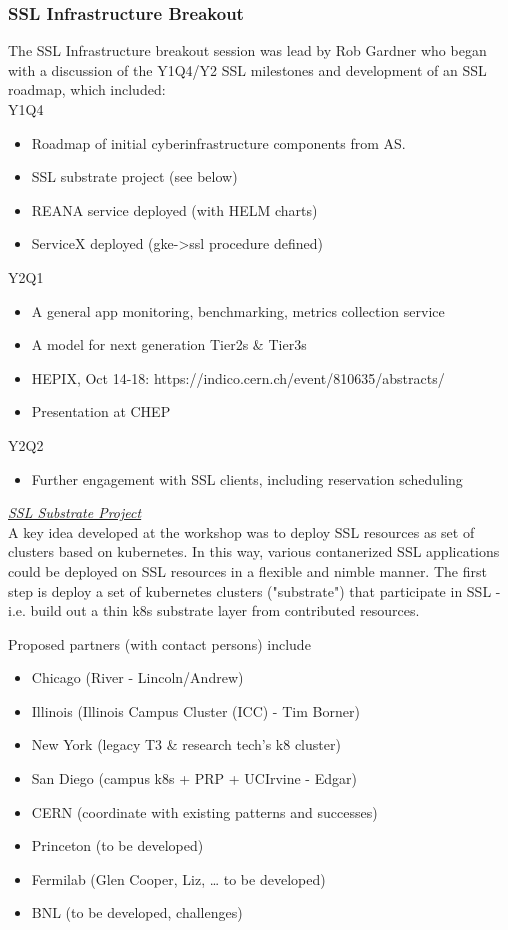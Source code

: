 \documentclass[11pt,letterpaper,fleqn]{article}
\begin{document}
\subsubsection{SSL Infrastructure Breakout}
The SSL Infrastructure breakout session was lead by Rob Gardner who began with a discussion of the Y1Q4/Y2 SSL milestones and development of an SSL roadmap, which included: \\
Y1Q4
\begin{itemize}
  \item Roadmap of initial cyberinfrastructure components from AS.
  \item SSL substrate project (see below)
  \item REANA service deployed (with HELM charts)
  \item ServiceX deployed (gke->ssl procedure defined)
\end{itemize}
Y2Q1
\begin{itemize}
  \item A general app monitoring, benchmarking, metrics collection service
  \item A model for next generation Tier2s \& Tier3s
  \item HEPIX, Oct 14-18: https://indico.cern.ch/event/810635/abstracts/
  \item Presentation at CHEP
\end{itemize}
Y2Q2
\begin{itemize}
  \item Further engagement with SSL clients, including reservation scheduling
\end{itemize}

\vspace{0.1cm}\noindent
\textit{\underline{SSL Substrate Project}} \\
A key idea developed at the workshop was to deploy SSL resources as set of clusters based on kubernetes. In this way, various contanerized SSL applications could be deployed on SSL resources in a flexible and nimble manner. The first step is deploy a set of kubernetes clusters ("substrate") that participate in SSL - i.e. build out a thin k8s substrate layer from contributed resources.

Proposed partners (with contact persons) include
\begin{itemize}
  \item Chicago (River - Lincoln/Andrew)
  \item Illinois (Illinois Campus Cluster (ICC) - Tim Borner)
  \item New York (legacy T3 \& research tech’s k8 cluster)
  \item San Diego (campus k8s + PRP + UCIrvine - Edgar)
  \item CERN (coordinate with existing patterns and successes)
  \item Princeton (to be developed)
  \item Fermilab (Glen Cooper, Liz, … to be developed)
  \item BNL (to be developed, challenges)
\end{itemize}
\end{document}
